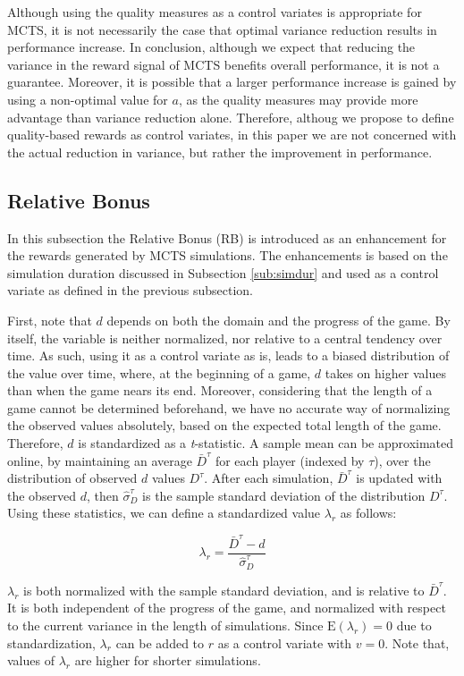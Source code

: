 \documentclass{ecai2014}
\newcommand{\E}[1]{\mathrm{E}\left( #1 \right)}
\begin{document}
Although using the quality measures as a control variates is appropriate for MCTS, it is not necessarily the case that optimal variance reduction results in performance increase. In conclusion, although we expect that reducing the variance in the reward signal of MCTS benefits overall performance, it is not a guarantee. Moreover, it is possible that a larger performance increase is gained by using a non-optimal value for $a$, as the quality measures may provide more advantage than variance reduction alone. Therefore, althoug we propose to define quality-based rewards as control variates, in this paper we are not concerned with the actual reduction in variance, but rather the improvement in performance.

\subsection{Relative Bonus}
\label{subsec:rb}
In this subsection the Relative Bonus (RB) is introduced as an enhancement for the rewards generated by MCTS simulations. The enhancements is based on the simulation duration discussed in Subsection \ref{sub:simdur} and used as a control variate as defined in the previous subsection.

First, note that $d$ depends on both the domain and the progress of the game. By itself, the variable is neither normalized, nor relative to a central tendency over time. As such, using it as a control variate as is, leads to a biased distribution of the value over time, where, at the beginning of a game, $d$ takes on higher values than when the game nears its end. Moreover, considering that the length of a game cannot be determined beforehand, we have no accurate way of normalizing the observed values absolutely, based on the expected total length of the game. Therefore, $d$ is standardized as a \emph{t}-statistic. A sample mean can be approximated online, by maintaining an average $\bar{D}^\tau$ for each player (indexed by $\tau$), over the distribution of observed $d$ values $D^\tau$. After each simulation, $\bar{D}^\tau$ is updated with the observed $d$, then $\hat{\sigma}^\tau_D$ is the sample standard deviation of the distribution $D^\tau$. Using these statistics, we can define a standardized value $\lambda_r$ as follows:

\begin{equation}
\lambda_r = \frac{\bar{D}^\tau - d}{\hat{\sigma}^\tau_D}
\end{equation}

$\lambda_r$ is both normalized with the sample standard deviation, and is relative to $\bar{D}^\tau$. It is both independent of the progress of the game, and normalized with respect to the current variance in the length of simulations. Since $\E{\lambda_r} = 0$ due to standardization, $\lambda_r$ can be added to $r$ as a control variate with $v = 0$. Note that, values of $\lambda_r$ are higher for shorter simulations.
\end{document}
